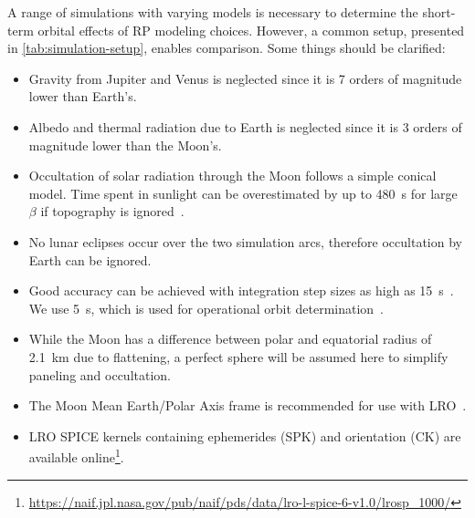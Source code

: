 A range of simulations with varying models is necessary to determine the short-term orbital effects of \gls{RP} modeling choices. However, a common setup, presented in \cref{tab:simulation-setup}, enables comparison. Some things should be clarified:
\begin{itemize}
    \item Gravity from Jupiter and Venus is neglected since it is 7 orders of magnitude lower than Earth's.
    \item Albedo and thermal radiation due to Earth is neglected since it is 3 orders of magnitude lower than the Moon's.
    \item Occultation of solar radiation through the Moon follows a simple conical model. Time spent in sunlight can be overestimated by up to \qty{480}{\s} for large $\beta$ if topography is ignored~\cite{Mazarico2018}.
    \item No lunar eclipses occur over the two simulation arcs, therefore occultation by Earth can be ignored.
    \item Good accuracy can be achieved with integration step sizes as high as \qty{15}{\s}~\cite{Mazarico2018}. We use \qty{5}{\s}, which is used for operational orbit determination~\cite{Nicholson2010}.
    \item While the Moon has a difference between polar and equatorial radius of \qty{2.1}{\km} due to flattening, a perfect sphere will be assumed here to simplify paneling and occultation.
    \item The Moon Mean Earth/Polar Axis frame is recommended for use with \gls{LRO}~\cite{GSFC2008}.
    \item \gls{LRO} SPICE kernels containing ephemerides (SPK) and orientation (CK) are available online\footnote{\url{https://naif.jpl.nasa.gov/pub/naif/pds/data/lro-l-spice-6-v1.0/lrosp_1000/}}.
\end{itemize}
